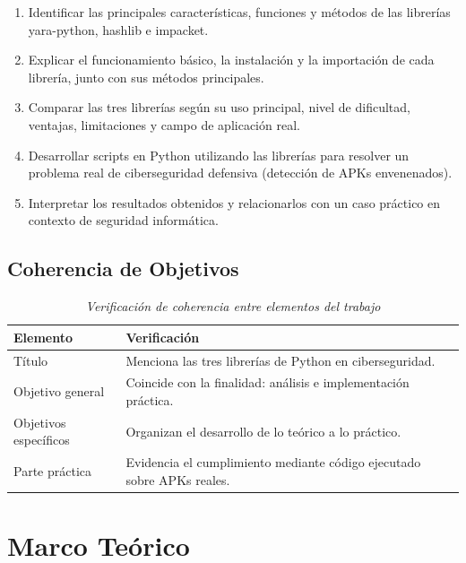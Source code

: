 \documentclass[12pt,a4paper]{article}
\begin{document}
\begin{enumerate}
\item Identificar las principales características, funciones y métodos de
  las librerías yara-python, hashlib e impacket.
\item Explicar el funcionamiento básico, la instalación y la importación de
  cada librería, junto con sus métodos principales.
\item Comparar las tres librerías según su uso principal, nivel de
  dificultad, ventajas, limitaciones y campo de aplicación real.
\item Desarrollar scripts en Python utilizando las librerías para resolver
  un problema real de ciberseguridad defensiva (detección de APKs
  envenenados).
\item Interpretar los resultados obtenidos y relacionarlos con un caso
  práctico en contexto de seguridad informática.
\end{enumerate}

\subsection{Coherencia de Objetivos}

\begin{table}[H]
\centering
\begin{threeparttable}
\caption{\textit{Verificación de coherencia entre elementos del trabajo}}
\begin{tabular}{p{4.5cm}p{8cm}}
\toprule
\textbf{Elemento} & \textbf{Verificación} \\
\midrule
Título & Menciona las tres librerías de Python en ciberseguridad. \\
Objetivo general & Coincide con la finalidad: análisis e implementación práctica. \\
Objetivos específicos & Organizan el desarrollo de lo teórico a lo práctico. \\
Parte práctica & Evidencia el cumplimiento mediante código ejecutado sobre APKs reales. \\
\bottomrule
\end{tabular}
\end{threeparttable}
\end{table}

\section{Marco Teórico}
\end{document}
